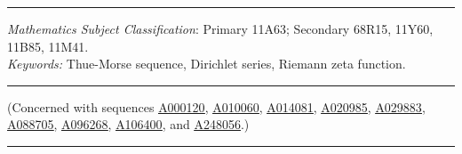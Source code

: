 \documentclass[12pt,reqno]{article}
\newcommand{\seqnum}[1]{\href{https://oeis.org/#1}{\underline{#1}}}
\begin{document}
\bigskip
\hrule
\bigskip

 {\it Mathematics Subject Classification}: Primary 11A63; Secondary 68R15, 11Y60, 11B85, 11M41. \\
\noindent \emph{Keywords: } Thue-Morse sequence, Dirichlet series, Riemann zeta function.

\bigskip
\hrule
\bigskip

\noindent (Concerned with sequences
\seqnum{A000120},
\seqnum{A010060},
\seqnum{A014081},
\seqnum{A020985},
\seqnum{A029883},
\seqnum{A088705},
\seqnum{A096268},
\seqnum{A106400}, and
\seqnum{A248056}.)

\bigskip
\hrule
\bigskip
	
\end{document}

